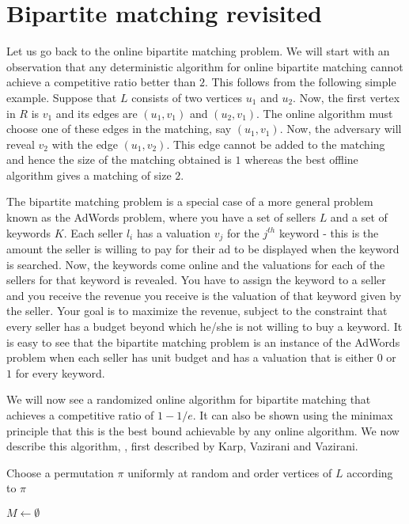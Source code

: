 \section{Bipartite matching revisited}

Let us go back to the online bipartite matching problem. We will start with an observation that any deterministic algorithm for online bipartite matching cannot achieve a competitive ratio better than $2$. This follows from the following simple example. Suppose that $L$ consists of two vertices $u_1$ and $u_2$. Now, the first vertex in $R$ is $v_1$ and its edges are $(u_1, v_1)$ and $(u_2, v_1)$. The online algorithm must choose one of these edges in the matching, say $(u_1, v_1)$. Now, the adversary will reveal $v_2$ with the edge $(u_1, v_2)$. This edge cannot be added to the matching and hence the size of the matching obtained is $1$ whereas the best offline algorithm gives a matching of size $2$. 

The bipartite matching problem is a special case of a more general problem known as the AdWords problem, where you have a set of sellers $L$ and a set of keywords $K$. Each seller $l_i$ has a valuation $v_j$ for the $j^{th}$ keyword - this is the amount the seller is willing to pay for their ad to be displayed when the keyword is searched. Now, the keywords come online and the valuations for each of the sellers for that keyword is revealed. You have to assign the keyword to a seller and you receive the revenue you receive is the valuation of that keyword given by the seller. Your goal is to maximize the revenue, subject to the constraint that every seller has a budget beyond which he/she is not willing to buy a keyword. It is easy to see that the bipartite matching problem is an instance of the AdWords problem when each seller has unit budget and has a valuation that is either $0$ or $1$ for every keyword.

We will now see a randomized online algorithm for bipartite matching that achieves a competitive ratio of $1 - 1/e$. It can also be shown using the minimax principle that this is the best bound achievable by any online algorithm. We now describe this algorithm, \ranking, first described by Karp, Vazirani and Vazirani.

\begin{algorithm}[h]
	
	Choose a permutation $\pi$ uniformly at random and order vertices of $L$ according to $\pi$
	
	$M \gets \emptyset$
	
	\label{alg:ranking}
	\caption{\ranking}
\end{algorithm}  


